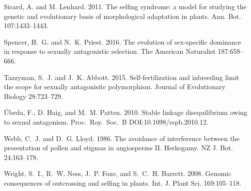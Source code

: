 \documentclass{article}
\begin{document}
\begin{thebibliography}{}
Sicard, A. and M. Lenhard. 2011.
\newblock The selfing syndrome: a model for studying the genetic and evolutionary basis of morphological adaptation in plants.
\newblock Ann. Bot. 107:1433--1443.

Spencer, H.~G. and N.~K. Priest. 2016.
\newblock The evolution of sex-specific dominance in response to sexually antagonistic selection.
\newblock The American Naturalist 187:658--666.

Tazzyman, S.~J. and J.~K. Abbott. 2015.
\newblock Self-fertilization and inbreeding limit the scope for sexually antagonisitc polymorphism.
\newblock Journal of Evolutionary Biology 28:723--729.

\'Ubeda, F., D. Haig, and M.~M. Patten. 2010.
\newblock Stable linkage disequilibrium owing to sexual antagonism.
\newblock Proc.~Roy.~Soc.~B DOI:10.1098/rspb.2010.12.

Webb, C.~J. and D.~G. Lloyd. 1986.
\newblock The avoidance of interference between the presentation of pollen and stigmas in angiosperms II. Herkogamy.
\newblock NZ J. Bot. 24:163--178.

Wright, S.~I., R.~W. Ness, J.~P. Foxe, and S.~C.~H. Barrett. 2008.
\newblock Genomic consequences of outcrossing and selfing in plants.
\newblock Int. J. Plant Sci. 169:105--118.


\end{thebibliography}
\end{document}
